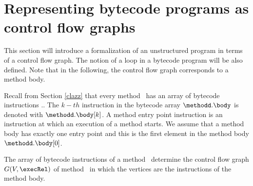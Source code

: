 \newtheorem{defEdge}{Definition}[section]
\newtheorem{defLoop}[defEdge]{Definition}

\newtheorem{defInv}[defEdge]{Definition}
\newtheorem{defModif}[defEdge]{Definition}

\newtheorem{propPath}{Lemma}[section]

\section{Representing bytecode programs as control flow graphs}\label{prelim:ctrFlow}

This section will introduce a formalization of an unstructured program in terms of a control flow graph.
The notion of a loop in a bytecode program will be also defined. Note that in the following,
the control flow graph corresponds to a method body. 


Recall from Section \ref{clazz} that every method \methodd \ has an array of bytecode instructions \methodd.\body.
The $k-th$ instruction in the bytecode array $\methodd.\body$ is  denoted with $\methodd.\body[k]$. A method entry point instruction is 
 an instruction at which an execution of a method starts.
 We assume that a method body has exactly one entry point
 and this is the first element in the method body $\methodd.\body[0]$.

 The array of bytecode instructions of a method \methodd \ determine the control flow graph $G( V , \execRel ) $  of method \methodd \ 
in which the vertices are the instructions of the method body.



